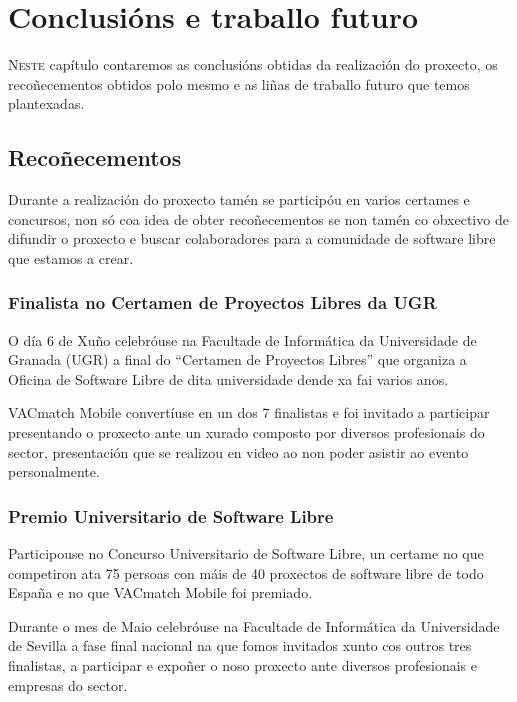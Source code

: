 \chapter{Conclusións e traballo futuro}
\minitoc


  \lettrine{N}{este} capítulo contaremos as conclusións obtidas da 
realización do proxecto, os recoñecementos obtidos polo mesmo e as liñas de 
traballo futuro que temos plantexadas.

\section{Recoñecementos}

Durante a realización do proxecto tamén se participóu en varios certames e 
concursos, non só coa idea de obter recoñecementos se non tamén co obxectivo de 
difundir o proxecto e buscar colaboradores para a comunidade de software libre 
que estamos a crear.

  \subsection{Finalista no Certamen de Proyectos Libres da UGR}
  O día 6 de Xuño celebróuse na Facultade de Informática da Universidade de 
Granada (UGR) a final do ``Certamen de Proyectos Libres'' que organiza a 
Oficina de Software Libre de dita universidade dende xa fai varios anos.

  VACmatch Mobile convertíuse en un dos 7 finalistas e foi invitado a 
participar presentando o proxecto ante un xurado composto por diversos 
profesionais do sector, presentación que se realizou en video ao non 
poder asistir ao evento personalmente.

  \subsection{Premio Universitario de Software Libre}
  Participouse no Concurso Universitario de Software Libre, un certame no que 
competiron ata 75 persoas con máis de 40 proxectos de software libre de todo 
España e no que VACmatch Mobile foi premiado.

  Durante o mes de Maio celebróuse na Facultade de Informática da Universidade 
de Sevilla a fase final nacional na que fomos invitados xunto cos 
outros tres finalistas, a participar e expoñer o noso proxecto ante diversos 
profesionais e empresas do sector.

